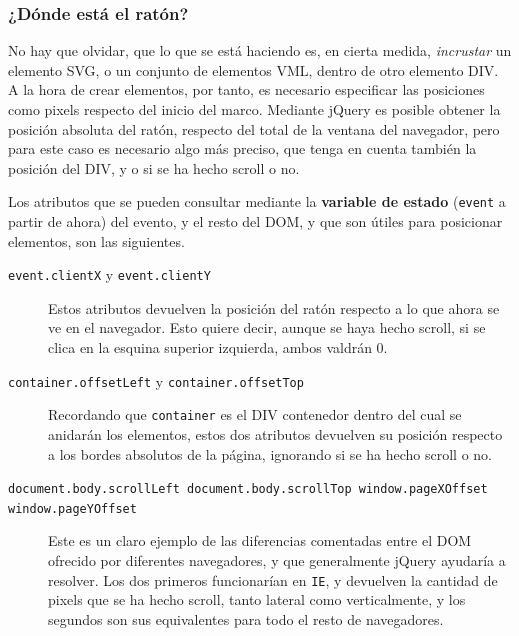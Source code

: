 
\subsubsection{¿Dónde está el ratón?} %
\label{ssub:donde_esta_el_raton}

No hay que olvidar, que lo que se está haciendo es, en cierta medida, \emph{incrustar} un elemento SVG, o un conjunto de elementos VML, dentro de otro elemento DIV. A la hora de crear elementos, por tanto, es necesario especificar las posiciones como pixels respecto del inicio del marco. Mediante jQuery es posible obtener la posición absoluta del ratón, respecto del total de la ventana del navegador, pero para este caso es necesario algo más preciso, que tenga en cuenta también la posición del DIV, y o si se ha hecho scroll o no.

Los atributos que se pueden consultar mediante la \textbf{variable de estado} (\texttt{event} a partir de ahora) del evento, y el resto del DOM, y que son útiles para posicionar elementos, son las siguientes.

\begin{description}
  \item[\texttt{event.clientX} y \texttt{event.clientY}] Estos atributos devuelven la posición del ratón respecto a lo que ahora se ve en el navegador. Esto quiere decir, aunque se haya hecho scroll, si se clica en la esquina superior izquierda, ambos valdrán 0.
  \item[\texttt{container.offsetLeft} y \texttt{container.offsetTop}] Recordando que \texttt{container} es el DIV contenedor dentro del cual se anidarán los elementos, estos dos atributos devuelven su posición respecto a los bordes absolutos de la página, ignorando si se ha hecho scroll o no.
  \item[\texttt{document.body.scrollLeft document.body.scrollTop window.pageXOffset window.pageYOffset}] Este es un claro ejemplo de las diferencias comentadas entre el DOM ofrecido por diferentes navegadores, y que generalmente jQuery ayudaría a resolver. Los dos primeros funcionarían en \texttt{IE}, y devuelven la cantidad de pixels que se ha hecho scroll, tanto lateral como verticalmente, y los segundos son sus equivalentes para todo el resto de navegadores.
\end{description}



